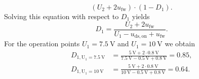 \begin{solutionblock}
\begin{equation*}
		(U_\mathrm{2} + 2 u_\mathrm{fw}) \cdot (1-D_\mathrm{1}).
	\end{equation*}
	Solving this equation with respect to $D_\mathrm{1}$ yields
	\begin{equation*}
		D_\mathrm{1} = \frac{U_\mathrm{2}+ 2 u_\mathrm{fw}}{U_\mathrm{1}-u_\mathrm{ds,on} + u_\mathrm{fw}}.
	\end{equation*}
	For the operation points $U_\mathrm{1}=\SI{7.5}{\volt}$ and $U_\mathrm{1}=\SI{10}{\volt}$ we obtain
	\begin{align*}
		D_\mathrm{1, U_\mathrm{1} = \SI{7.5}{\volt}} & =\frac{\SI{5}{\volt} + 2 \cdot \SI{0.8}{\volt}}{\SI{7.5}{\volt} - \SI{0.5}{\volt} + \SI{0.8}{\volt}} = 0.85, \\
		D_\mathrm{1, U_\mathrm{1} = \SI{10}{\volt}}  & =\frac{\SI{5}{\volt} + 2 \cdot \SI{0.8}{\volt}} {\SI{10}{\volt} - \SI{0.5}{\volt} + \SI{0.8}{\volt}} = 0.64.
	\end{align*}

\end{solutionblock}

